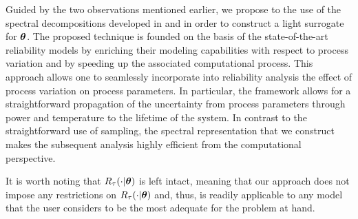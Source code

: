 Guided by the two observations mentioned earlier, we propose to the use of the spectral decompositions developed in  and  in order to construct a light surrogate for $\bm{\theta}$.
The proposed technique is founded on the basis of the state-of-the-art reliability models by enriching their modeling capabilities with respect to process variation and by speeding up the associated computational process.
This approach allows one to seamlessly incorporate into reliability analysis the effect of process variation on process parameters.
In particular, the framework allows for a straightforward propagation of the uncertainty from process parameters through power and temperature to the lifetime of the system.
In contrast to the straightforward use of  sampling, the spectral representation that we construct makes the subsequent analysis highly efficient from the computational perspective.

It is worth noting that $R_\tau(\cdot | \bm{\theta})$ is left intact, meaning that our approach does not impose any restrictions on $R_\tau(\cdot | \bm{\theta})$ and, thus, is readily applicable to any model that the user considers to be the most adequate for the problem at hand.
